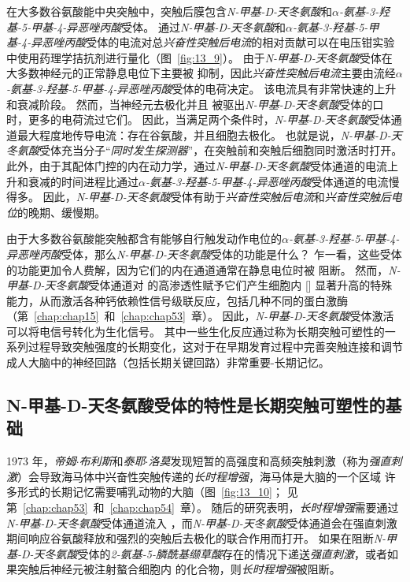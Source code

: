在大多数谷氨酸能中央突触中，突触后膜包含\textit{N-甲基-D-天冬氨酸}和\textit{$\alpha$-氨基-3-羟基-5-甲基-4-异恶唑丙酸}受体。
通过\textit{N-甲基-D-天冬氨酸}和\textit{$\alpha$-氨基-3-羟基-5-甲基-4-异恶唑丙酸}受体的电流对总\textit{兴奋性突触后电流}的相对贡献可以在电压钳实验中使用药理学拮抗剂进行量化（图~\ref{fig:13_9}）。
由于\textit{N-甲基-D-天冬氨酸}受体在大多数神经元的正常静息电位下主要被  抑制，因此\textit{兴奋性突触后电流}主要由流经\textit{$\alpha$-氨基-3-羟基-5-甲基-4-异恶唑丙酸}受体的电荷决定。
该电流具有非常快速的上升和衰减阶段。
然而，当神经元去极化并且  被驱出\textit{N-甲基-D-天冬氨酸}受体的口时，更多的电荷流过它们。
因此，当满足两个条件时，\textit{N-甲基-D-天冬氨酸}受体通道最大程度地传导电流：存在谷氨酸，并且细胞去极化。
也就是说，\textit{N-甲基-D-天冬氨酸}受体充当分子“\textit{同时发生探测器}”，在突触前和突触后细胞同时激活时打开。
此外，由于其配体门控的内在动力学，通过\textit{N-甲基-D-天冬氨酸}受体通道的电流上升和衰减的时间进程比通过\textit{$\alpha$-氨基-3-羟基-5-甲基-4-异恶唑丙酸}受体通道的电流慢得多。
因此，\textit{N-甲基-D-天冬氨酸}受体有助于\textit{兴奋性突触后电流}和\textit{兴奋性突触后电位}的晚期、缓慢期。


由于大多数谷氨酸能突触都含有能够自行触发动作电位的\textit{$\alpha$-氨基-3-羟基-5-甲基-4-异恶唑丙酸}受体，那么\textit{N-甲基-D-天冬氨酸}受体的功能是什么？
乍一看，这些受体的功能更加令人费解，因为它们的内在通道通常在静息电位时被  阻断。
然而，\textit{N-甲基-D-天冬氨酸}受体通道对  的高渗透性赋予它们产生细胞内 [] 显著升高的特殊能力，从而激活各种钙依赖性信号级联反应，包括几种不同的蛋白激酶（第~\ref{chap:chap15}~和~\ref{chap:chap53}~章）。
因此，\textit{N-甲基-D-天冬氨酸}受体激活可以将电信号转化为生化信号。
其中一些生化反应通过称为长期突触可塑性的一系列过程导致突触强度的长期变化，这对于在早期发育过程中完善突触连接和调节成人大脑中的神经回路（包括长期关键回路）非常重要-长期记忆。



\subsection{N-甲基-D-天冬氨酸受体的特性是长期突触可塑性的基础}

1973 年，\textit{帝姆$\cdot$布利斯}和\textit{泰耶$\cdot$洛莫}发现短暂的高强度和高频突触刺激（称为\textit{强直刺激}）会导致海马体中兴奋性突触传递的\textit{长时程增强}，海马体是大脑的一个区域 许多形式的长期记忆需要哺乳动物的大脑（图~\ref{fig:13_10}；
见第~\ref{chap:chap53}~和~\ref{chap:chap54}~章）。
随后的研究表明，\textit{长时程增强}需要通过\textit{N-甲基-D-天冬氨酸}受体通道流入 ，而\textit{N-甲基-D-天冬氨酸}受体通道会在强直刺激期间响应谷氨酸释放和强烈的突触后去极化的联合作用而打开。
如果在阻断\textit{N-甲基-D-天冬氨酸}受体的\textit{2-氨基-5-膦酰基缬草酸}存在的情况下递送\textit{强直刺激}，或者如果突触后神经元被注射螯合细胞内  的化合物，则\textit{长时程增强}被阻断。


